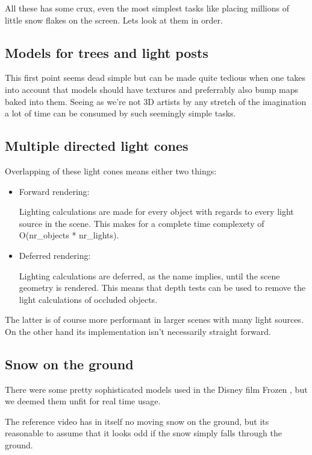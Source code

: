 \documentclass[a4paper,12pt]{article}
\begin{document}
All these has some crux, even the most simplest tasks like placing millions of little snow flakes on the screen. Lets look at them in order.


\subsection{Models for trees and light posts}

This first point seems dead simple but can be made quite tedious when one takes into account that models should have textures and preferrably also bump maps baked into them. Seeing as we're not 3D artists by any stretch of the imagination a lot of time can be consumed by such seemingly simple tasks.


\subsection{Multiple directed light cones}

Overlapping of these light cones means either two things:

\begin{itemize}
\item Forward rendering:

  Lighting calculations are made for every object with regards to every light source in the scene. This makes for a complete time complexety of O(nr\_objects * nr\_lights).

\item Deferred rendering:

  Lighting calculations are deferred, as the name implies, until the scene geometry is rendered. This means that depth tests can be used to remove the light calculations of occluded objects.
\end{itemize}

The latter is of course more performant in larger scenes with many light sources. On the other hand its implementation isn't necessarily straight forward.


\subsection{Snow on the ground}

There were some pretty sophisticated models used in the Disney film Frozen \cite{disney-snow}, but we deemed them unfit for real time usage.

The reference video has in itself no moving snow on the ground, but its reasonable to assume that it looks odd if the snow simply falls through the ground.
\end{document}
